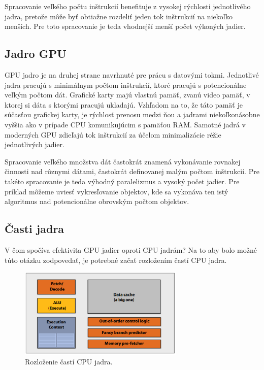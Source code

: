 Spracovanie veľkého počtu inštrukcií benefituje z vysokej rýchlosti jednotlivého jadra, pretože môže byť obtiažne rozdeliť jeden tok inštrukcií na niekoľko menších. Pre toto spracovanie je teda vhodnejší menší počet výkoných jadier.

\subsection*{Jadro GPU}
GPU jadro je na druhej strane navrhnuté pre prácu s datovými tokmi. Jednotlivé jadra pracujú s minimálnym počtom inštrukcií, ktoré pracujú s potencionálne veľkým počtom dát. Grafické karty majú vlastnú pamäť, zvanú video pamäť, v ktorej si dáta s ktorými pracujú ukladajú. Vzhľadom na to, že táto pamäť je súčasťou grafickej karty, je rýchlosť prenosu medzi ňou a jadrami niekoľkonásobne vyššia ako v prípade CPU komunikujúcim s pamäťou RAM. Samotné jadrá v moderných GPU zdieľajú tok inštrukcií za účelom minimalizácie réžie jednotlivých jadier.

\label{gpulogic}
Spracovanie veľkého množstva dát častokrát znamená vykonávanie rovnakej činnosti nad rôznymi dátami, častokrát definovanej malým počtom inštrukcií. Pre takéto spracovanie je teda výhodný paralelizmus a vysoký počet jadier. Pre príklad môžeme uviesť vykresľovanie objektov, kde sa vykonáva ten istý algoritmus nad potencionálne obrovským počtom objektov.

\subsection*{Časti jadra}
V čom spočíva efektivita GPU jadier oproti CPU jadrám? Na to aby bolo možné túto otázku zodpovedať, je potrebné začať rozložením častí CPU jadra.

\begin{figure}[H]
	\centering
	\includegraphics[width=0.7\textwidth]{obrazky-figures/cpucore.eps}
	\caption{Rozloženie častí CPU jadra.}
	\label{cpucore}
\end{figure}

